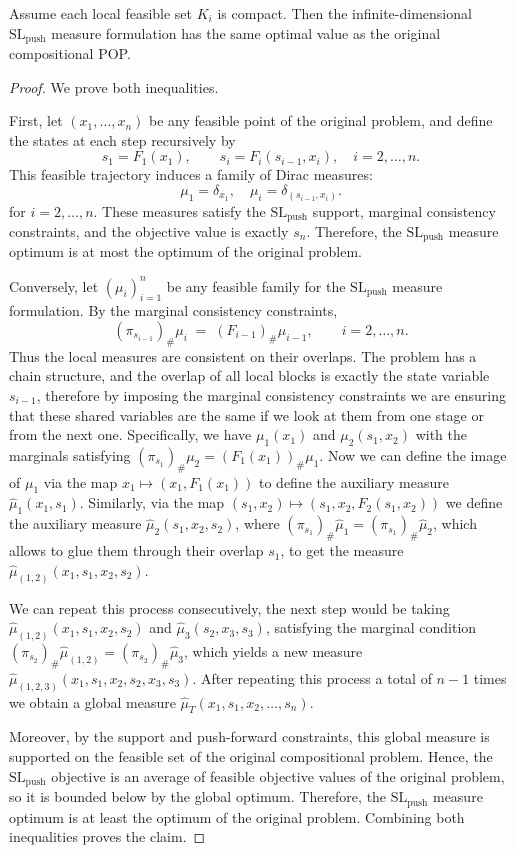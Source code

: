 \documentclass[10pt,a4paper]{amsart}
\begin{document}
\begin{proposition}
Assume each local feasible set $K_i$ is compact. Then the infinite-dimensional $\mathrm{SL}_{\mathrm{push}}$ measure formulation has the same optimal value as the original compositional POP.
\label{prop:gluing}
\end{proposition}

\begin{proof}
We prove both inequalities.

First, let $(x_1,\dots,x_n)$ be any feasible point of the original problem, and define the states at each step recursively by
\[
s_1=F_1(x_1), \qquad s_i=F_i(s_{i-1},x_i), \quad i=2,\dots,n.
\]
This feasible trajectory induces a family of Dirac measures:
\[
\mu_1=\delta_{x_1}, \quad \mu_i=\delta_{(s_{i-1},x_i)}.
\]
for $i=2,\dots, n$. These measures satisfy the $\mathrm{SL}_{\mathrm{push}}$ support, marginal consistency constraints, and the objective value is exactly $s_n$. Therefore, the $\mathrm{SL}_{\mathrm{push}}$ measure optimum is at most the optimum of the original problem.

Conversely, let $(\mu_i)_{i=1}^n$ be any feasible family for the $\mathrm{SL}_{\mathrm{push}}$ measure formulation. By the marginal consistency constraints,
\[
(\pi_{s_{i-1}})_\#\mu_i\;=\; (F_{i-1})_{\#}\mu_{i-1}, \qquad i=2,\dots,n.
\]
Thus the local measures are consistent on their overlaps. The problem has a chain structure, and the overlap of all local blocks is exactly the state variable $s_{i-1}$, therefore by imposing the marginal consistency constraints we are ensuring that these shared variables are the same if we look at them from one stage or from the next one. Specifically, we have $\mu_1(x_1)$ and $\mu_2(s_1,x_2)$ with the marginals satisfying $(\pi_{s_{1}})_\#\mu_2= (F_{1}(x_1))_{\#}\mu_{1}$. Now we can define the image of $\mu_1$ via the map $x_1\mapsto (x_1,F_1(x_1))$ to define the auxiliary measure $\hat{\mu}_1(x_1,s_1)$. Similarly, via the map $(s_1,x_2)\mapsto (s_1,x_2,F_2(s_1,x_2))$ we define the auxiliary measure $\hat{\mu}_2(s_1,x_2,s_2)$, where $(\pi_{s_{1}})_\#\hat{\mu}_1= (\pi_{s_{1}})_\#\hat{\mu}_2$, which allows to glue them through their overlap $s_1$, to get the measure $\hat{\mu}_{(1,2)}(x_1,s_1,x_2,s_2)$. 


We can repeat this process consecutively, the next step would be taking $\hat{\mu}_{(1,2)}(x_1,s_1,x_2,s_2)$ and $\hat{\mu}_3(s_2,x_3,s_3)$, satisfying the marginal condition $(\pi_{s_{2}})_\#\hat{\mu}_{(1,2)}= (\pi_{s_{2}})_\#\hat{\mu}_3$, which yields a new measure $\hat{\mu}_{(1,2,3)}(x_1,s_1,x_2,s_2,x_3,s_3)$. After repeating this process a total of $n-1$ times we obtain a global measure $\hat{\mu}_T(x_1,s_1,x_2,\dots,s_n)$.


Moreover, by the support and push-forward constraints, this global measure is supported on the feasible set of the original compositional problem. Hence, the $\mathrm{SL}_{\mathrm{push}}$ objective is an average of feasible objective values of the original problem, so it is bounded below by the global optimum. Therefore, the $\mathrm{SL}_{\mathrm{push}}$ measure optimum is at least the optimum of the original problem. Combining both inequalities proves the claim.
\end{proof}
\end{document}
